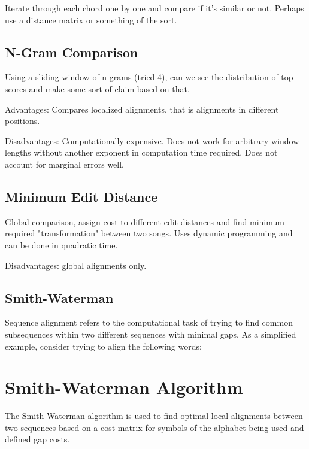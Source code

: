 \item Iterate through each chord one by one and compare if it's similar or not. Perhaps use a distance matrix or something of the sort.

\subsection{N-Gram Comparison}

\item Using a sliding window of n-grams (tried 4), can we see the distribution of top scores and make some sort of claim based on that.

\item Advantages: Compares localized alignments, that is alignments in different positions.

\item Disadvantages: Computationally expensive. Does not work for arbitrary window lengths without another exponent in computation time required. Does not account for marginal errors well.

\subsection{Minimum Edit Distance}

\item Global comparison, assign cost to different edit distances and find minimum required "transformation" between two songs. Uses dynamic programming and can be done in quadratic time.

\item Disadvantages: global alignments only.

\subsection{Smith-Waterman}

Sequence alignment refers to the computational task of trying to find common subsequences within two different sequences with minimal gaps. As a simplified example, consider trying to align the following words:


\section{Smith-Waterman Algorithm}

The Smith-Waterman algorithm is used to find optimal local alignments between two sequences based on a cost matrix for symbols of the alphabet being used and defined gap costs.

